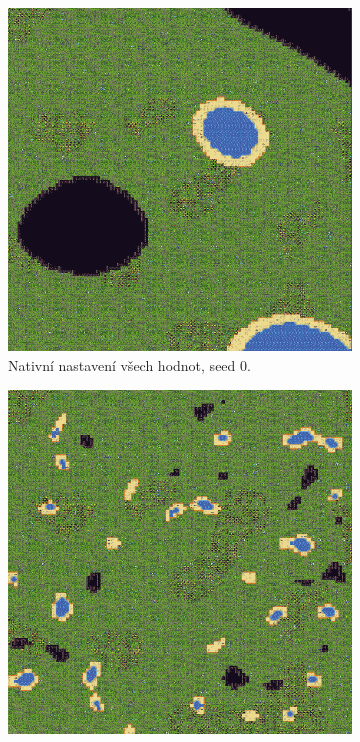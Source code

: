 \begin{figure}[H]
	\centering
	\begin{subfigure}{0.475\textwidth}
		\centering
		\includegraphics[scale=0.45]{obrazky-figures/NoiseScale70.png}
		\caption{Nativní nastavení všech hodnot, seed 0.}
	\end{subfigure}
	\begin{subfigure}{0.475\textwidth}
		\centering
		\includegraphics[scale=0.45]{obrazky-figures/NoiseScale10.png}

\end{subfigure}
\end{figure}
